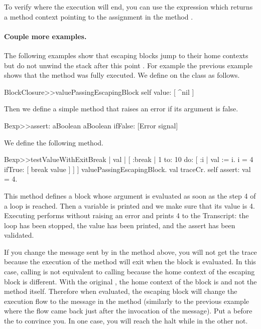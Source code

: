\documentclass[a4paper,10pt,twoside]{book}
\begin{document}
To verify where the execution will end, you can use the expression  which returns a method context pointing to the assignment in the method .

\paragraph{Couple more examples.}
The following examples show that escaping blocks jump to their home contexts but do not unwind the stack after this point . For example the previous example shows that the method  was fully executed.
We define  on the class  as follows.

\begin{code}{}
BlockClosure>>valuePassingEscapingBlock
	  self value: [ ^nil ]
\end{code}

Then we define a simple  method that raises an error if its argument is false.

\begin{code}{}
Bexp>>assert: aBoolean
	aBoolean ifFalse: [Error signal]
\end{code}

We define the following method.

\begin{code}{}
Bexp>>testValueWithExitBreak
	| val |
	[ :break |
	    1 to: 10 do: [ :i |
			         val := i.
			         i = 4 ifTrue: [ break value ] ] ] valuePassingEscapingBlock.
	val traceCr.
	self assert: val = 4.
\end{code}

This method defines a block whose argument  is evaluated as soon as the step 4 of a loop is reached. Then a variable  is printed and we make sure that its value is 4. Executing  performs without raising an error and prints 4 to the Transcript: the loop has been stopped, the value has been printed, and the assert has been validated.

If you change the  message sent by  in the  method above, you will not get the trace because the execution of the method  will exit when the block is evaluated. In this case, calling  is not equivalent to calling  because the home context of the escaping block \ct{[ ^ nil ]} is different.  With the original , the home context of the block \ct{[^ nil]}
is  and not the method  itself.
Therefore when evaluated, the escaping block will change the execution flow to the  message in the method  (similarly to the previous example where the flow came back just after the invocation of the  message). Put a  before the  to convince you. In one case, you will reach the halt while in the other not.
\end{document}
